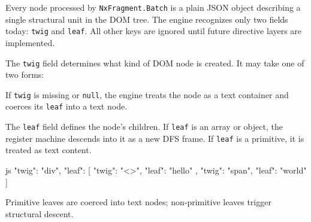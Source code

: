 
\begin{NxLightBox}[title={IR Node Schema -- Minimal JSON Form}]
	\begin{NxLightP}
		Every node processed by \texttt{NxFragment.Batch} is a plain JSON object describing a single structural unit in the DOM tree. The engine recognizes only two fields today: \texttt{twig} and \texttt{leaf}. All other keys are ignored until future directive layers are implemented.
	\end{NxLightP}
\end{NxLightBox}

\begin{NxLightListBox}[title={Recognized Fields}]
\end{NxLightListBox}

\begin{NxLightBox}[title={\texttt{twig} -- Opcode and Namespace}]
	\begin{NxLightP}
		The \texttt{twig} field determines what kind of DOM node is created. It may take one of two forms:
	\end{NxLightP}

	\begin{NxLightList}
	\end{NxLightList}

	\begin{NxLightP}
		If \texttt{twig} is missing or \texttt{null}, the engine treats the node as a text container and coerces its \texttt{leaf} into a text node.
	\end{NxLightP}
\end{NxLightBox}

\begin{NxLightBox}[title={\texttt{leaf} -- Structural Children}]
	\begin{NxLightP}
		The \texttt{leaf} field defines the node’s children. If \texttt{leaf} is an array or object, the register machine descends into it as a new DFS frame. If \texttt{leaf} is a primitive, it is treated as text content.
	\end{NxLightP}

	\begin{NxCodeBox}{js}{}
{ "twig": "div", "leaf": [
	{ "twig": "<>", "leaf": "hello" },
	{ "twig": "span", "leaf": "world" }
]}
	\end{NxCodeBox}

	\begin{NxLightP}
		Primitive leaves are coerced into text nodes; non‑primitive leaves trigger structural descent.
	\end{NxLightP}
\end{NxLightBox}

